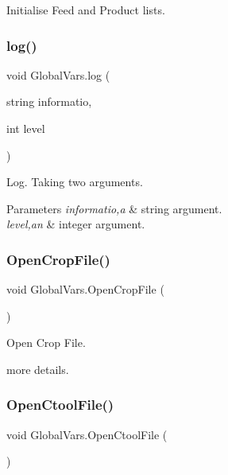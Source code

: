 Initialise Feed and Product lists. 

\mbox{\label{class_global_vars_a4b8a43181c226aed4b3334209f337ae2}} 
\subsubsection{\texorpdfstring{log()}{log()}}
{\footnotesize\ttfamily void Global\+Vars.\+log (\begin{DoxyParamCaption}\item[{string}]{informatio,  }\item[{int}]{level }\end{DoxyParamCaption})\hspace{0.3cm}{\ttfamily [inline]}}



Log. Taking two arguments. 


\begin{DoxyParams}{Parameters}
{\em informatio,a} & string argument. \\
\hline
{\em level,an} & integer argument. \\
\hline
\end{DoxyParams}
\mbox{\label{class_global_vars_a96dcdedd261f3aaf43edfd203a3b940d}} 
\subsubsection{\texorpdfstring{OpenCropFile()}{OpenCropFile()}}
{\footnotesize\ttfamily void Global\+Vars.\+Open\+Crop\+File (\begin{DoxyParamCaption}{ }\end{DoxyParamCaption})\hspace{0.3cm}{\ttfamily [inline]}}



Open Crop File. 

more details. \mbox{\label{class_global_vars_a946e269cb4206093e882f56cbe93e266}} 
\subsubsection{\texorpdfstring{OpenCtoolFile()}{OpenCtoolFile()}}
{\footnotesize\ttfamily void Global\+Vars.\+Open\+Ctool\+File (\begin{DoxyParamCaption}{ }\end{DoxyParamCaption})\hspace{0.3cm}{\ttfamily [inline]}}



